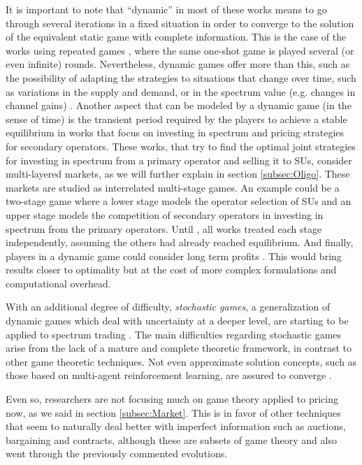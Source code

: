It is important to note that ``dynamic'' in most of these works means to go through several iterations in a fixed situation in order to converge to the solution of the equivalent static game with complete information. 
This is the case of the works using repeated games \cite{ref:Niyato2007_Game,ref:Niyato2008_Comp,ref:Niyato2009_Dyn,ref:Jia2008_com,ref:Ji2008}, where the same one-shot game is played several (or even infinite) rounds. 
Nevertheless, dynamic games offer more than this, such as the possibility of adapting the strategies to situations that change over time, such as variations in the supply and demand, or in the spectrum value (e.g. changes in channel gains) \cite{ref:Ji2006}.
Another aspect that can be modeled by a dynamic game (in the sense of time) is the transient period required by the players to achieve a stable equilibrium in works that focus on investing in spectrum and pricing strategies for secondary operators.
These works, that try to find the optimal joint strategies for investing in spectrum from a primary operator and selling it to SUs, consider multi-layered markets, as we will further explain in section \ref{subsec:Oligo}. These markets are studied as interrelated multi-stage games. 
An example could be a two-stage game where a lower stage models the operator selection of SUs and an upper stage models the competition of secondary operators in investing in spectrum from the primary operators. Until \cite{ref:Zhu2012_Dyn}, all works treated each stage independently, assuming the others had already reached equilibrium. 
And finally, players in a dynamic game could consider long term profits \cite{ref:Ji2008,ref:Zhu2012_Dyn,ref:Niyato2008_Comp,ref:Xu2012}.
This would bring results closer to optimality but at the cost of more complex formulations and computational overhead.

With an additional degree of difficulty, \textit{stochastic games}, a generalization of dynamic games which deal with uncertainty at a deeper level, are starting to be applied to spectrum trading \cite{ref:Shen2013}.
The main difficulties regarding stochastic games arise from the lack of a mature and complete theoretic framework, in contrast to other game theoretic techniques.
Not even approximate solution concepts, such as those based on multi-agent reinforcement learning, are assured to converge \cite{ref:Shoham2007}.

Even so, researchers are not focusing much on game theory applied to pricing now, as we said in section \ref{subsec:Market}.
This is in favor of other techniques that seem to naturally deal better with imperfect information such as auctions, bargaining and contracts, although these are subsets of game theory and also went through the previously commented evolutions.

